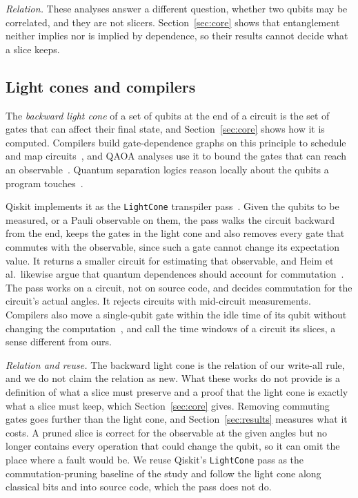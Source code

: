 \emph{Relation.} These analyses answer a different question, whether two qubits may be correlated, and they are
not slicers. Section~\ref{sec:core} shows that entanglement neither implies nor is implied by dependence, so
their results cannot decide what a slice keeps.

\subsection{Light cones and compilers}
The \emph{backward light cone} of a set of qubits at the end of a circuit is the set of gates that can
affect their final state, and Section~\ref{sec:core} shows how it is computed. Compilers build gate-dependence graphs on this
principle to schedule and map circuits~\cite{murali2019triq, amy2020staq}, and QAOA analyses use it to bound the
gates that can reach an observable~\cite{farhi2014qaoa}. Quantum separation logics reason locally about the qubits
a program touches~\cite{zhou2021qsl, le2022qsl}.

Qiskit implements it as the \texttt{LightCone} transpiler pass~\cite{qiskit2025}. Given the qubits to be
measured, or a Pauli observable on them, the pass walks the circuit backward from the end, keeps the gates in the
light cone and also removes every gate that commutes with the observable, since such a gate cannot change its
expectation value. It returns a smaller circuit for estimating that observable, and Heim et al.\ likewise argue
that quantum dependences should account for commutation~\cite{heim2020quantum}. The pass works on a circuit,
not on source code, and decides commutation for the circuit's actual angles. It rejects circuits with mid-circuit measurements. Compilers also move a single-qubit gate within the idle time of its qubit
without changing the computation~\cite{smith2022timestitch}, and call the time windows of a circuit its
slices, a sense different from ours.

\emph{Relation and reuse.} The backward light cone is the relation of our write-all rule, and we do not claim
the relation as new. What these works do not provide is a definition of what a slice must preserve and a proof
that the light cone is exactly what a slice must keep, which Section~\ref{sec:core} gives. Removing commuting
gates goes further than the light cone, and Section~\ref{sec:results} measures what it costs. A pruned slice is
correct for the observable at the given angles but no longer contains every operation that could change the
qubit, so it can omit the place where a fault would be. We reuse Qiskit's \texttt{LightCone} pass as the
commutation-pruning baseline of the study and follow the light cone along classical bits and into source code,
which the pass does not do.

